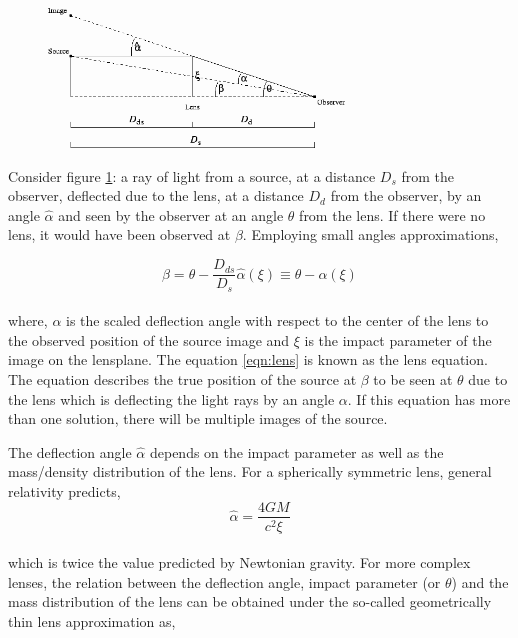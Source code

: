 \begin{figure}
	\centering
	\includegraphics[width=0.7\textwidth]{figures/lens_geometry.png}
	\caption{}
	\label{fig:lens}
\end{figure}

Consider figure \ref{fig:lens}: a ray of light from a source, at a distance $D_s$ from
the observer, deflected due to the lens, at a distance $D_d$ from the observer,  by an 
angle $\hat{\alpha}$ and seen
by the observer at an angle $\theta$ from the lens. If there were no lens, it would have
been observed at $\beta$. Employing small angles approximations, 

\begin{equation}
	\beta  = \theta  - \dfrac{D_{ds}}{D_s} \hat{\alpha}(\xi) \equiv \theta - \alpha(\xi)
	\label{eqn:lens}
\end{equation}
\\
where, $\alpha$ is the scaled deflection angle with respect to the center of the 
lens to the observed position of the source image and $\xi$ is the impact parameter
of the image on the lensplane. The equation \ref{eqn:lens} is known
as the lens equation. The equation describes the true position of the source at $\beta$ to
be seen at $\theta$ due to the lens which is deflecting the light rays by an angle $\alpha$.
If this equation has more than one solution, there will be multiple images of the source. 

The deflection angle $\hat{\alpha}$ depends on the impact parameter as well as the 
mass/density distribution of the lens. For a spherically symmetric lens, general relativity
predicts,
\begin{equation}
	\hat{\alpha} = \dfrac{4GM}{c^2 \xi}
\end{equation}
\\
which is twice the value predicted by Newtonian gravity. For more complex lenses, the 
relation between the deflection angle, impact parameter (or $\theta$) and the mass
distribution of the lens can be obtained under the so-called geometrically thin lens
approximation as,

